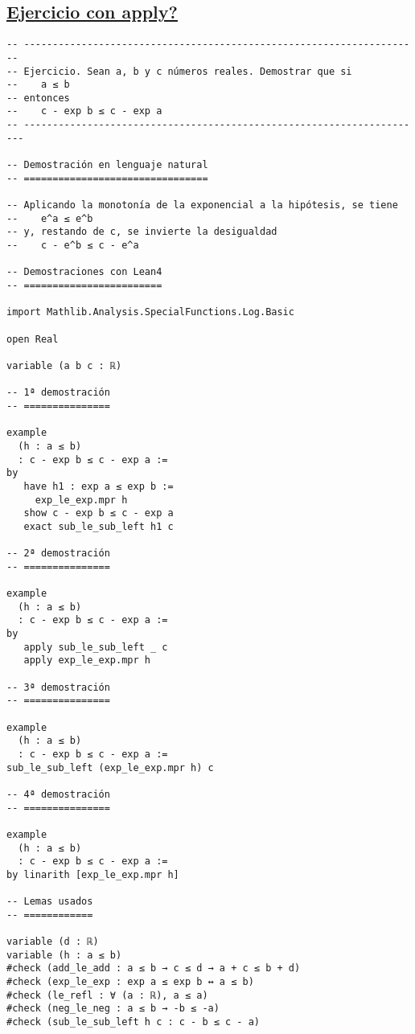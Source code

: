 \subsection{\href{./src/Basicos/Ejercicio\_con\_library\_search.lean}{Ejercicio con apply?}}
\label{sec:orgf9f43ec}
\begin{verbatim}
-- ---------------------------------------------------------------------
-- Ejercicio. Sean a, b y c números reales. Demostrar que si
--    a ≤ b
-- entonces
--    c - exp b ≤ c - exp a
-- ----------------------------------------------------------------------

-- Demostración en lenguaje natural
-- ================================

-- Aplicando la monotonía de la exponencial a la hipótesis, se tiene
--    e^a ≤ e^b
-- y, restando de c, se invierte la desigualdad
--    c - e^b ≤ c - e^a

-- Demostraciones con Lean4
-- ========================

import Mathlib.Analysis.SpecialFunctions.Log.Basic

open Real

variable (a b c : ℝ)

-- 1ª demostración
-- ===============

example
  (h : a ≤ b)
  : c - exp b ≤ c - exp a :=
by
   have h1 : exp a ≤ exp b :=
     exp_le_exp.mpr h
   show c - exp b ≤ c - exp a
   exact sub_le_sub_left h1 c

-- 2ª demostración
-- ===============

example
  (h : a ≤ b)
  : c - exp b ≤ c - exp a :=
by
   apply sub_le_sub_left _ c
   apply exp_le_exp.mpr h

-- 3ª demostración
-- ===============

example
  (h : a ≤ b)
  : c - exp b ≤ c - exp a :=
sub_le_sub_left (exp_le_exp.mpr h) c

-- 4ª demostración
-- ===============

example
  (h : a ≤ b)
  : c - exp b ≤ c - exp a :=
by linarith [exp_le_exp.mpr h]

-- Lemas usados
-- ============

variable (d : ℝ)
variable (h : a ≤ b)
#check (add_le_add : a ≤ b → c ≤ d → a + c ≤ b + d)
#check (exp_le_exp : exp a ≤ exp b ↔ a ≤ b)
#check (le_refl : ∀ (a : ℝ), a ≤ a)
#check (neg_le_neg : a ≤ b → -b ≤ -a)
#check (sub_le_sub_left h c : c - b ≤ c - a)
\end{verbatim}

